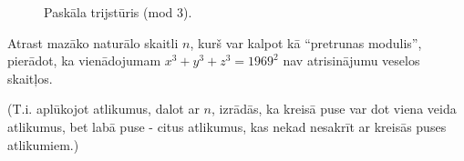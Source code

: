 \documentclass[a4paper,12pt]{article}
\newcommand\answer[1]{}
\begin{document}
\vspace{10pt}
\begin{figure}[!htb]
\caption{\label{fig:pascal-triangle} Paskāla trijstūris (mod 3).}
\end{figure}

\vspace{10pt}
\begin{problem}
Atrast mazāko naturālo skaitli $n$, kurš var kalpot kā ``pretrunas modulis'', 
pierādot, ka vienādojumam $x^3 + y^3 + z^3 = 1969^2$ nav atrisinājumu veselos skaitļos. 

(T.i. aplūkojot atlikumus, dalot ar $n$, izrādās, ka kreisā puse var dot viena veida atlikumus, 
bet labā puse - citus atlikumus, kas nekad nesakrīt ar kreisās puses atlikumiem.)
\answer{

{\bf Atbilde.} $\mathtt{9}$\\
Izrakstām iespējamās $x^3$ vērtības (mod $m$), kur $m = 2,3,\ldots,9$. 
Moduļus $m = 6$, $m=10$ it kā arī varētu aplūkot (un dažos vienādojumos iegūt pretrunas), 
bet faktiski pretrunas rodas pēc pirmskaitļu (vai pirmskaitļu pakāpju) moduļiem.

{\footnotesize
\[ \left\{ \begin{array}{l}
x^3 \equiv 0,1 \pmod{2}\\
x^3 \equiv 0,1,2 \pmod{3}\\
x^3 \equiv 0,1,3 \pmod{4}\\
x^3 \equiv 0,1,2,3,4 \pmod{5}\\
x^3 \equiv 0,1,6 \equiv 0,1,-1 \pmod{7}\\
x^3 \equiv 0,1,3,5,7 \pmod{8}\\ 
x^3 \equiv 0,1,8 \equiv 0,1,-1 \pmod{9}\\ 
\end{array} \right. \]
}

Ievērojam, ka moduļiem $m=7$ un $m=9$ ir tikai trīs iespējamie atlikumi ($\{ 0,1,-1 \}$).
Vienlaikus labajā pusē ir šādi atlikumi:
\[ \left\{ \begin{array}{l}
1969^2 \equiv 4 \pmod{7}\\
1969^2 \equiv 4 \pmod{9}\\
\end{array} \right. \]
Vērtībai $m=7$ atlikumu $4$ var iegūt saskaitot $-1$ trīs reizes: $(-1) + (-1) + (-1) \equiv 4 \pmod{7}$.
Arī pie $m<7$ pretrunas modulis nesanāk, jo kubu summa pieņem jebkādas vērtības.

Atliek pretrunas modulis $m=9$, kas arī ir mūsu atbilde.
}
\end{problem}
\end{document}
